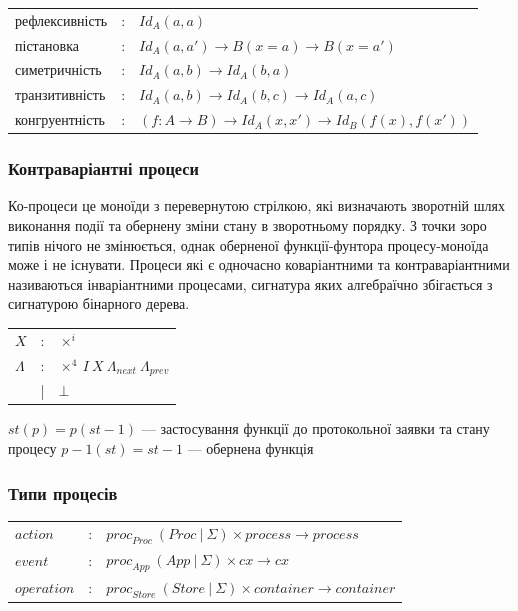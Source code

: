 \documentclass[11pt,oneside]{article}
\begin{document}
\begin{center}
\begin{tabular}{lll}
  рефлексивність &:& $Id_A(a,a)$ \\
  пістановка     &:& $Id_A(a,a') \rightarrow B(x=a) \rightarrow B(x=a')$ \\
  симетричність  &:& $Id_A(a,b) \rightarrow Id_A(b,a)$  \\
  транзитивність &:& $Id_A(a,b) \rightarrow Id_A(b,c) \rightarrow Id_A(a,c)$ \\
  конгруентність &:& $(f: A \rightarrow B) \rightarrow Id_A(x,x') \rightarrow Id_B(f(x),f(x'))$ \\
\end{tabular}
\end{center}



  \subsubsection*{Контраваріантні процеси}

  Ко-процеси це моноїди з перевернутою стрілкою, які визначають зворотній шлях виконання
  події та обернену зміни стану в зворотньому порядку. З точки зоро типів нічого не змінюється,
  однак оберненої функції-фунтора процесу-моноїда може і не існувати. Процеси які є
  одночасно коваріантними та контраваріантними називаються інваріантними процесами, сигнатура яких
  алгебраїчно збігається з сигнатурою бінарного дерева.

\begin{center}
\begin{tabular}{lcl}
$X$         &:& $\times^{i}$ \\
$\Lambda$   &:& $\times^{4} \ I \ X \ \Lambda_{next} \ \Lambda_{prev}$ \\
            &|& $\bot$ \\
\end{tabular}
\end{center}

\begin{center}
$st(p) = p(st-1)$ — застосування функції до протокольної заявки та стану процесу
$p-1(st) = st-1$ — обернена функція
\end{center}

  \subsubsection*{Типи процесів}

\begin{center}
\begin{tabular}{lll}
         $action$ &:& ${proc}_{Proc}\ (Proc\ |\ \Sigma) \times process \rightarrow process$ \\
         $event$  &:& ${proc}_{App}\ (App\ |\ \Sigma) \times cx \rightarrow cx$ \\
         $operation$    &:& ${proc}_{Store}\ (Store\ |\ \Sigma) \times container \rightarrow container$ \\
\end{tabular}
\end{center}
\end{document}
